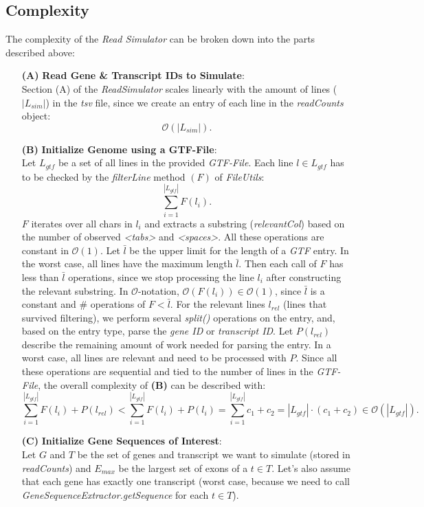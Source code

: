 \documentclass[12pt]{article}
\begin{document}
\subsection{Complexity}
The complexity of the \textit{Read Simulator} can be broken down into the parts described above:
\begin{enumerate}
	\item[\textbf{(A)}] \textbf{Read Gene \& Transcript IDs to Simulate}:\\
        Section (A) of the \textit{ReadSimulator} scales linearly with the amount of lines ($|L_{sim}|$) in the \textit{tsv} file, since
        we create an entry of each line in the \textit{readCounts} object:
        \[
            \mathcal{O}(|L_{sim}|)
        .\]
	\item[\textbf{(B)}] \textbf{Initialize Genome using a GTF-File}:\\
        Let $L_{gtf}$ be a set of all lines in the provided \textit{GTF-File}. 
        Each line $l \in L_{gtf}$ has to be checked by the \textit{filterLine} method $(F)$ of \textit{FileUtils}:
        \[
            \sum_{i=1}^{|L_{gtf}|} F(l_{i})
        .\]
        $F$ iterates over all chars in $l_{i}$ and extracts a substring (\textit{relevantCol}) based on the number
        of observed \textit{<tabs>} and \textit{<spaces>}. All these operations are constant in $\mathcal{O}(1)$.
        Let $\bar{l}$ be the upper limit for the length of a \textit{GTF} entry. In the worst case, all lines
        have the maximum length $\bar{l}$. Then each call of $F$ has less than $\bar{l}$ operations, since we 
        stop processing the line $l_{i}$ after constructing the relevant substring. In $\mathcal{O}$-notation, 
        $\mathcal{O}(F(l_{i})) \in \mathcal{O}(1)$, since $\bar{l}$ is a constant and $\#$ operations of $F < \bar{l}$.
        For the relevant lines $l_{rel}$ (lines that survived filtering), we perform several 
        \textit{split()} operations on the entry, and, based on the entry type, parse the \textit{gene ID}
        or \textit{transcript ID}. Let $P(l_{rel})$ describe the remaining amount of work needed
        for parsing the entry. In a worst case, all lines are relevant and need to be processed with $P$.
        Since all these operations are sequential and tied to the number of lines in the \textit{GTF-File}, the overall complexity of \textbf{(B)} can be 
        described with: 
        \[
            \sum_{i=1}^{|L_{gtf}|} F(l_{i}) + P(l_{rel}) < \sum_{i=1}^{|L_{gtf}|} F(l_{i}) + P(l_{i}) = \sum_{i=1}^{|L_{gtf}|} c_{1} + c_{2} = |L_{gtf}| \cdot (c_{1} + c_{2}) \in \mathcal{O}(|L_{gtf}|)
        .\]
        \newpage
	\item[\textbf{(C)}] \textbf{Initialize Gene Sequences of Interest}:\\
        Let $G$ and $T$ be the set of genes and transcript we want to simulate (stored in \textit{readCounts}) and $E_{max}$ be the largest set of exons of a $t \in T$.
        Let's also assume that each gene has exactly one transcript (worst case, because we need to call \textit{GeneSequenceExtractor.getSequence} for each $t \in T$).


\end{enumerate}
\end{document}
